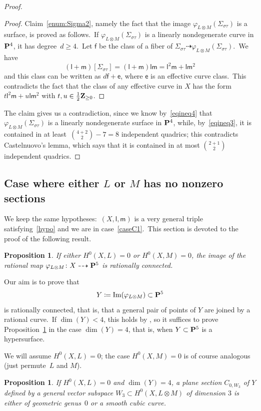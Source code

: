 \documentclass[12pt]{amsart}
\def\Z{{\bf Z}}
\def\P{{\bf P}}
\def\phi{\varphi}
\def\Im{\mathop{\rm Im}\nolimits}
\def\dra{\dashrightarrow}
\newtheorem{prop}[lemm]{Proposition}
\theoremstyle{remark}
\def\lll{\ensuremath{\mathsf l}}
\def\eee{\ensuremath{\mathsf e}}
\def\fff{\ensuremath{\mathsf f}}
\def\mm{\ensuremath{\mathsf m}}
\begin{document}
\begin{proof}
\begin{proof}
Claim~\ref{enum:Sigma2}, namely the fact that the image $\phi_{L\otimes M}(\Sigma_{\sigma\tau})$ is a surface, is proved as follows.\
If $\phi_{L\otimes M}(\Sigma_{\sigma\tau})$ is a linearly nondegenerate curve in $\P^4$, it has degree~$d\ge4$.\ Let $\fff$ be the class of a fiber of $\Sigma_{\sigma\tau}\dra\phi_{L\otimes M}(\Sigma_{\sigma\tau})$.\
 We have
\[
(\lll+\mm)[\Sigma_{\sigma\tau}]=(\lll+\mm)\lll\mm = \lll^2\mm + \lll\mm^2
\]
and this class can be written as $d\fff+\eee$, where $\eee$ is an effective curve class.\  This contradicts the fact that the class of any effective curve in $X$ has the form $t \lll^2\mm+u \lll\mm^2$  with   $t, u\in\frac12\Z_{\ge0}$.\end{proof}
The claim gives us a contradiction, since we know by~\eqref{eqineq4} that $\phi_{L\otimes M}(\Sigma_{\sigma\tau})$ is a linearly nondegenerate surface in $\P^4$, while, by~\eqref{eqineq3}, it is contained in at least~$\binom{4+2}{2}-7=8$
independent quadrics; this contradicts Castelnuovo's lemma, which says that it is contained in at most $\binom{2+1}{2}$ independent quadrics.
\end{proof}


\subsection{Case where either $L$ or $M$   has no nonzero sections}\label{zero}
We keep the same hypotheses:~$(X,\lll,\mm)$ is a very   general triple satisfying~\eqref{hypo} and we are in case~\ref{caseC1}.\ This section is devoted to the proof of the following result.

\begin{prop}\label{prop:CaseB'2}
If  either $H^0(X,L)=0$ or $H^0(X,M)=0$, the image of the rational map $\phi_{L\otimes M}\colon X\dra \P^5$ is rationally connected.
\end{prop}

Our aim is to prove that
 \[
Y\coloneqq\Im(\phi_{L\otimes M})\subset \P^5  
\]
is rationally connected, that is, that a general pair of points of $Y$ are joined by a rational curve.\ 
If \mbox{$\dim (Y)<4$,} this holds  by \cite[Theorem~1.4]{linthese}, so it suffices to prove Proposition~\ref{prop:CaseB'2} in  the case $\dim (Y)=4$, that is, when $Y\subset \P^5$ is a hypersurface.\

 We will assume  $H^0(X,L)=0$; the case  $H^0(X,M)=0$ is of course analogous (just permute~$L$ and $M$).\ 

\begin{prop}\label{prop6.3precise} If   $H^0(X,L)=0$ and $\dim (Y)=4$, a plane section $C_{0,W_3}$ of $Y$ defined by a general vector subspace $W_3\subset H^0(X,L\otimes M)$ of dimension $3$   is either  of geometric genus~$0$ or  a smooth cubic curve.
\end{prop}
\end{document}
